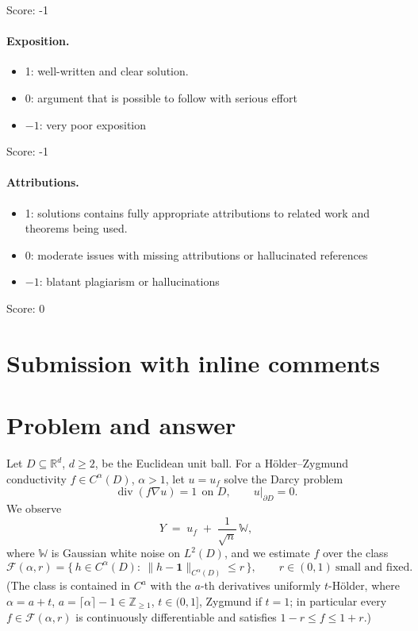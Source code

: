 \documentclass[11pt]{article}
\theoremstyle{remark}
\newcommand{\R}{\mathbb{R}}
\newcommand{\F}{\mathcal{F}}
\newcommand{\W}{\mathbb{W}}
\newcommand{\one}{\mathbf{1}}
\newcommand{\norm}[1]{\lVert #1\rVert}
\newcommand{\SET}[1]{\{#1\}}
\DeclareMathOperator{\diver}{div}
\begin{document}
\noindent Score: -1 

\paragraph{Exposition.}
\begin{itemize}
	\item  1: well-written and clear solution.
	\item  0: argument that is possible to follow with serious effort
	\item  $-1$: very poor exposition
\end{itemize}

\noindent Score: -1

\paragraph{Attributions.}
\begin{itemize}
	\item  1: solutions contains fully appropriate attributions
		to related work and theorems being used.
	\item  0: moderate issues with missing attributions or hallucinated references
	\item  $-1$: blatant plagiarism or hallucinations
\end{itemize}

\noindent Score: 0

\newpage
\section{Submission with inline comments}


\section{Problem and answer}

Let $D\subseteq\R^{d}$, $d\ge2$, be the Euclidean unit ball. For a
H\"older--Zygmund conductivity $f\in C^{\alpha}(D)$, $\alpha>1$, let
$u=u_{f}$ solve the Darcy problem
\[
\diver(f\nabla u)=1\ \ \text{on }D,\qquad u|_{\partial D}=0 .
\]
We observe
\[
Y\;=\;u_{f}\;+\;\frac{1}{\sqrt{n}}\,\W ,
\]
where $\W$ is Gaussian white noise on $L^{2}(D)$, and we estimate $f$ over
the class
\[
\F(\alpha,r)=\SET{\,h\in C^{\alpha}(D):\ \norm{h-\one}_{C^{\alpha}(D)}\le r\,},
\qquad r\in(0,1)\ \text{small and fixed}.
\]
(The class is contained in $C^{a}$ with the $a$-th derivatives uniformly
$t$-H\"older, where $\alpha=a+t$, $a=\lceil\alpha\rceil-1\in\mathbb Z_{\ge1}$,
$t\in(0,1]$, Zygmund if $t=1$; in particular every $f\in\F(\alpha,r)$ is
continuously differentiable and satisfies $1-r\le f\le1+r$.)
\end{document}
